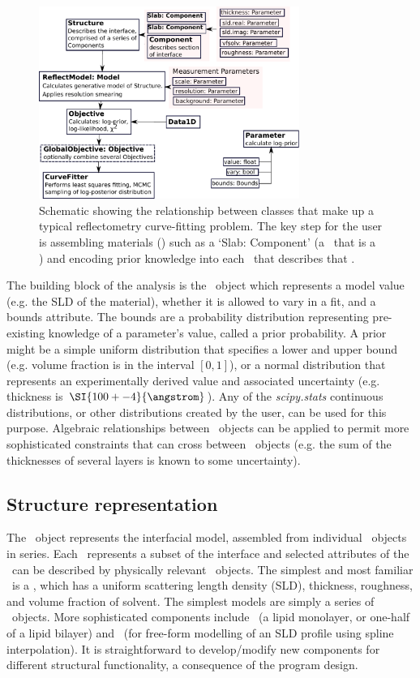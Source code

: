 \documentclass[pdf,preprint]{iucr}
\begin{document}
\begin{figure}
  \includegraphics[width=85mm]{components.pdf}
  \caption{Schematic showing the relationship between classes that make up a typical reflectometry curve-fitting problem. The key step for the user is assembling materials (\Component) such as a `Slab: Component' (a \Component\ that is a \Slab) and encoding prior knowledge into each \Parameter\ that describes that \Component.}
  \label{fig:components}
\end{figure}

The building block of the analysis is the \Parameter\ object which represents a model value (e.g. the SLD of the material), whether it is allowed to vary in a fit, and a bounds attribute. The bounds are a probability distribution representing pre-existing knowledge of a parameter's value, called a prior probability.
A prior might be a simple uniform distribution that specifies a lower and upper bound (e.g. volume fraction is in the interval $[0, 1]$), or a normal distribution that represents an experimentally derived value and associated uncertainty (e.g. thickness is $\SI{100+-4}{\angstrom}$).
Any of the \emph{scipy.stats} \cite{Jones2001-2017} continuous distributions, or other distributions created by the user, can be used for this purpose. Algebraic relationships between \Parameter\ objects can be applied to permit more sophisticated constraints that can cross between \Component\ objects (e.g. the sum of the thicknesses of several layers is known to some uncertainty).

\subsection{Structure representation}

The \Structure\ object represents the interfacial model, assembled from individual \Component\ objects in series. Each \Component\ represents a subset of the interface and selected attributes of the \Component\ can be described by physically relevant \Parameter\ objects. The simplest and most familiar \Component\ is a \Slab, which has a uniform scattering length density (SLD), thickness, roughness, and volume fraction of solvent. The simplest models are simply a series of \Slab\ objects.
More sophisticated components include \LipidLeaflet\ (a lipid monolayer, or one-half of a lipid bilayer) and \Spline\ (for free-form modelling of an SLD profile using spline interpolation).
It is straightforward to develop/modify new components for different structural functionality, a consequence of the program design.
\end{document}
